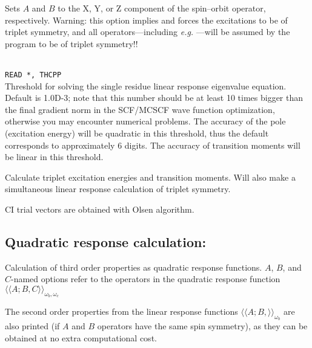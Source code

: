 \begin{description}
\item{}
Sets $A$ and $B$ to the X, Y, or Z component of the spin--orbit
operator, respectively.
Warning: this option implies  and
forces the excitations to be of triplet symmetry,
and all operators---including
{\it e.g.\/} ---will be assumed by the program to be of triplet symmetry!!

\item{}\\
\verb|READ *, THCPP|\\
Threshold for solving the single residue linear response eigenvalue equation.
Default is 1.0D-3; note that this number should be at least 10 times
bigger than the final gradient norm in the SCF/MCSCF
wave function optimization, otherwise you may encounter
numerical problems.
The accuracy of the pole (excitation energy) will be
quadratic in this threshold, thus the default corresponds to approximately
6 digits. The accuracy of transition moments will be linear in this threshold.

\item{} Calculate triplet excitation energies and transition moments.
Will also make a simultaneous linear response calculation of triplet symmetry.

\item{}
CI trial vectors are obtained with Olsen algorithm.

\end{description}

\subsection{Quadratic response calculation: }

Calculation of third order properties
 as quadratic response
functions.
$A$, $B$, and $C$-named options refer to the operators in the quadratic
response function
$\langle\!\langle A;B,C \rangle\!\rangle_{\omega_b,\omega_c}$
\cite{ovhapjhjajthjojcp97,hhhjajpjjojcp97,haovhkpjthjcp98}

The second order properties from the linear response functions
$\langle\!\langle A;B,\rangle\!\rangle_{\omega_b}$ are also printed
(if $A$ and $B$ operators have the same spin symmetry),
as they can be obtained at no extra computational cost.

